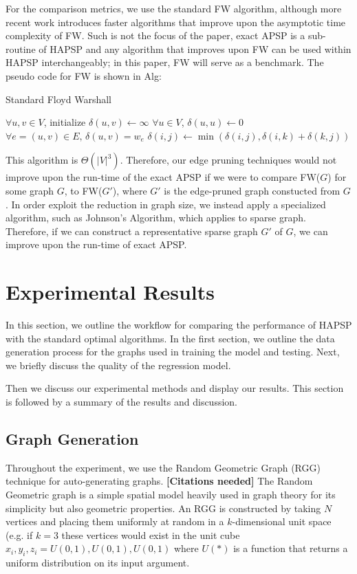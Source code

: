 \documentclass[10.5pt,journal]{IEEEtran}
\begin{document}
	For the comparison metrics, we use the standard FW algorithm, although more recent work
	introduces faster algorithms that improve upon the asymptotic time complexity of FW. Such
	is not the focus of the paper, exact APSP is a sub-routine of HAPSP and any algorithm that
	improves upon FW can be used within HAPSP interchangeably; 
	in this paper, FW will serve as a benchmark. The pseudo code for FW is shown in Alg:\\
	\begin{algorithm}
	\caption{Standard Floyd Warshall}
	\begin{algorithmic}[1]
	\State $\forall u,v \in V$, initialize $\delta(u,v)\leftarrow\infty$
	\State $\forall u \in V$, $\delta(u,u)\leftarrow 0$
	\State $\forall e = (u,v)\in E,\,\delta(u,v) = w_e$
				\State $\delta(i,j) \leftarrow \min(\delta(i,j),\delta(i,k)+\delta(k,j))$
			\EndFor
		\EndFor
	\EndFor
	\end{algorithmic}
	\label{fig:alg2}
	\end{algorithm}
	
	This algorithm is $\Theta(|V|^3)$. Therefore, our edge pruning techniques would not improve upon
	the run-time of the exact APSP if we were to compare FW($G$) for some graph $G$, to FW($G'$),
	where $G'$ is the edge-pruned graph constucted from $G$. In order exploit the reduction in graph
	size, we instead apply a specialized algorithm, such as Johnson's Algorithm, which applies to
	sparse graph. Therefore, if we can construct a representative sparse graph $G'$ of $G$,
	we can improve upon the run-time of exact APSP.\\
	
\section{Experimental Results}
	In this section, we outline the workflow for comparing the performance of HAPSP with the
	standard optimal algorithms. In the first section, we outline the data generation process
	for the graphs used in training the model and testing. Next, we briefly discuss the quality
	of the regression model.
	
	Then we discuss our experimental methods and display our results. This section is followed by
	a summary of the results and discussion.
	\subsection{Graph Generation}
		Throughout the experiment, we use the Random Geometric Graph (RGG) technique for auto-generating graphs.
		{\bf{[Citations needed]}}
		The Random Geometric graph is a simple spatial model heavily used in graph theory for its simplicity
		but also geometric properties. An RGG is constructed by taking $N$ vertices and placing them
		uniformly at random in a $k$-dimensional unit space (e.g. if $k=3$ these vertices would exist in
		the unit cube $x_i,y_i,z_i = U(0,1),U(0,1),U(0,1)$ where $U(*)$ is a function that returns a uniform
		distribution on its input argument.\\
		
\end{document}
